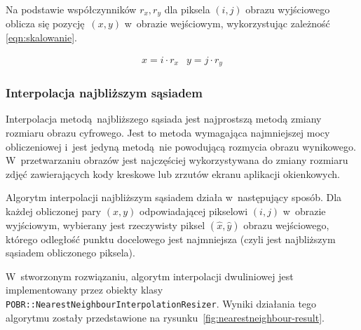 Na podstawie współczynników $r_{x}, r_{y}$ dla piksela $(i, j)$ obrazu wyjściowego oblicza się pozycję~$(x, y)$ w~obrazie wejściowym, wykorzystując zależność \ref{eqn:skalowanie}.

\begin{equation}
    \label{eqn:skalowanie}
    \begin{array}{ll}
        x = i \cdot r_{x} & y = j \cdot r_{y}
    \end{array} 
\end{equation}

\subsubsection{Interpolacja najbliższym sąsiadem}
Interpolacja metodą najbliższego sąsiada jest najprostszą metodą zmiany rozmiaru obrazu cyfrowego. Jest to metoda wymagająca najmniejszej mocy obliczeniowej i~jest jedyną metodą nie powodującą rozmycia obrazu wynikowego. W~przetwarzaniu obrazów jest najczęściej wykorzystywana do zmiany rozmiaru zdjęć zawierających kody kreskowe lub zrzutów ekranu aplikacji okienkowych.

Algorytm interpolacji najbliższym sąsiadem działa w~następujący sposób. Dla każdej obliczonej pary $(x,y)$ odpowiadającej pikselowi $(i, j)$ w~obrazie wyjściowym, wybierany jest rzeczywisty piksel $(\hat{x}, \hat{y})$ obrazu wejściowego, którego odległość punktu docelowego jest najmniejsza (czyli jest najbliższym sąsiadem obliczonego piksela).


W~stworzonym rozwiązaniu, algorytm interpolacji dwuliniowej jest implementowany przez  obiekty klasy \texttt{POBR::NearestNeighbourInterpolationResizer}. Wyniki działania tego algorytmu zostały przedstawione na rysunku~\ref{fig:nearestneighbour-result}. 

